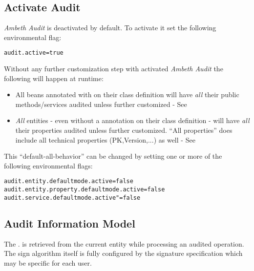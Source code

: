 \subsection{Activate Audit}
\textit{Ambeth Audit} is deactivated by default. To activate it set the following environmental flag:
\begin{lstlisting}[style=Props]
audit.active=true
\end{lstlisting}

Without any further customization step with activated \textit{Ambeth Audit} the following will happen at runtime:
\begin{itemize}
	\item All beans annotated with \type{\@Audited} on their class definition will have \emph{all} their public methods/services audited unless further customized - See 
	\item \emph{All} entities - even without a  annotation on their class definition - will have \emph{all} their properties audited unless further customized. ``All properties'' does include all technical properties (PK,Version,...) as well - See 
\end{itemize}

This ``default-all-behavior'' can be changed by setting one or more of the following environmental flags:
\begin{lstlisting}[style=Props]
audit.entity.defaultmode.active=false
audit.entity.property.defaultmode.active=false
audit.service.defaultmode.active"=false
\end{lstlisting}

\subsection{Audit Information Model}

\def\showimgref{img/gen/2014-10-04-DeK-Ambeth-Audit-3}

The . is retrieved from the current  entity while processing an audited operation. The sign algorithm itself is fully configured by the signature specification which may be specific for each user.


